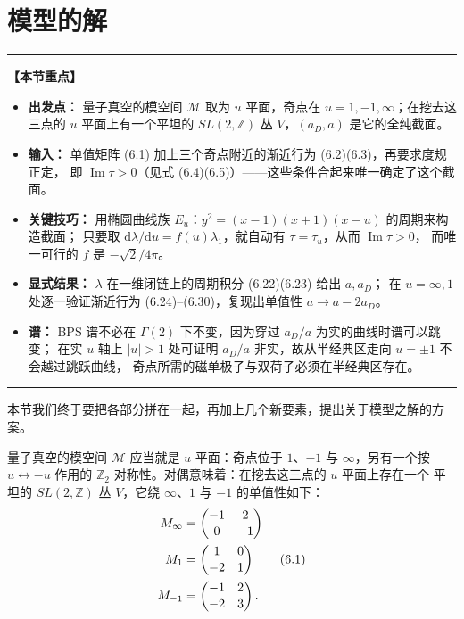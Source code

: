 \documentclass[11pt,a4paper,UTF8,fontset=fandol]{ctexart}
\theoremstyle{plain}
\theoremstyle{definition}
\newenvironment{keypoints}{%
  \par\addvspace{0.9em}%
  \noindent\begin{minipage}{\linewidth}%
  \color{black!80}\rule{\linewidth}{0.6pt}\par\vspace{2pt}%
  \noindent\textbf{【本节重点】}\par\vspace{2pt}%
  \begin{itemize}[leftmargin=1.6em,itemsep=1pt,topsep=2pt,parsep=0pt]%
}{%
  \end{itemize}\vspace{1pt}\noindent\color{black!80}\rule{\linewidth}{0.6pt}%
  \end{minipage}\par\addvspace{0.9em}%
}
\newcommand{\Z}{\mathbb{Z}}
\newcommand{\dd}{\mathrm{d}}
\renewcommand{\Im}{\operatorname{Im}}
\newcommand{\Mm}{\mathcal{M}}
\begin{document}
\section{模型的解}
\begin{keypoints}
  \item \textbf{出发点：} 量子真空的模空间 $\Mm$ 取为 $u$ 平面，奇点在 $u=1,-1,\infty$；在挖去这三点的
        $u$ 平面上有一个平坦的 $SL(2,\Z)$ 丛 $V$，$(a_D,a)$ 是它的全纯截面。
  \item \textbf{输入：} 单值矩阵 (6.1) 加上三个奇点附近的渐近行为 (6.2)(6.3)，再要求度规正定，
        即 $\Im\tau>0$（见式 (6.4)(6.5)）——这些条件合起来唯一确定了这个截面。
  \item \textbf{关键技巧：} 用椭圆曲线族 $E_u$：$y^2=(x-1)(x+1)(x-u)$ 的周期来构造截面；
        只要取 $\dd\lambda/\dd u=f(u)\lambda_1$，就自动有 $\tau=\tau_u$，从而 $\Im\tau>0$，
        而唯一可行的 $f$ 是 $-\sqrt2/4\pi$。
  \item \textbf{显式结果：} $\lambda$ 在一维闭链上的周期积分 (6.22)(6.23) 给出 $a,a_D$；
        在 $u=\infty,1$ 处逐一验证渐近行为 (6.24)--(6.30)，复现出单值性 $a\to a-2a_D$。
  \item \textbf{谱：} BPS 谱不必在 $\Gamma(2)$ 下不变，因为穿过 $a_D/a$ 为实的曲线时谱可以跳变；
        在实 $u$ 轴上 $|u|>1$ 处可证明 $a_D/a$ 非实，故从半经典区走向 $u=\pm1$ 不会越过跳跃曲线，
        奇点所需的磁单极子与双荷子必须在半经典区存在。
\end{keypoints}

本节我们终于要把各部分拼在一起，再加上几个新要素，提出关于模型之解的方案。

量子真空的模空间 $\Mm$ 应当就是 $u$ 平面：奇点位于 $1$、$-1$ 与 $\infty$，另有一个按
$u\leftrightarrow-u$ 作用的 $\Z_2$ 对称性。对偶意味着：在挖去这三点的 $u$ 平面上存在一个
平坦的 $SL(2,\Z)$ 丛 $V$，它绕 $\infty$、$1$ 与 $-1$ 的单值性如下：
\begin{align}
  M_\infty&=\begin{pmatrix}-1&2\\[1pt]0&-1\end{pmatrix}\notag\\
  M_1&=\begin{pmatrix}1&0\\[1pt]-2&1\end{pmatrix} \tag{6.1}\\
  M_{-1}&=\begin{pmatrix}-1&2\\[1pt]-2&3\end{pmatrix}.\notag
\end{align}
\end{document}
